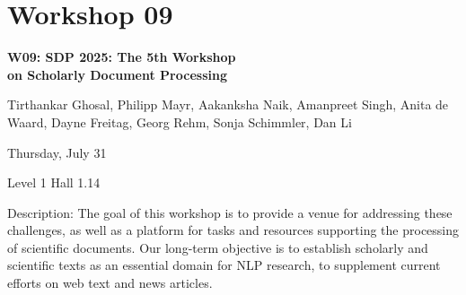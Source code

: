 \clearpage


\section[W09: SDP 2025: The 5th Workshop \\
on Scholarly Document Processing]{Workshop 09}
\label{workshop_9}

\begin{center}
    {\Large \textbf{W09: SDP 2025: The 5th Workshop \\
    on Scholarly Document Processing}}\\

 \vspace{5mm}

    Tirthankar Ghosal, Philipp Mayr, Aakanksha Naik, Amanpreet Singh, Anita de Waard, Dayne Freitag, Georg Rehm, Sonja Schimmler, Dan Li\\

 \vspace{5mm}
 
    Thursday, July 31
    
    Level 1 Hall 1.14

\end{center}

Description: The goal of this workshop is to provide a venue for addressing these challenges, as well as a platform for tasks and resources supporting the processing of scientific documents. Our long-term objective is to establish scholarly and scientific texts as an essential domain for NLP research, to supplement current efforts on web text and news articles.

